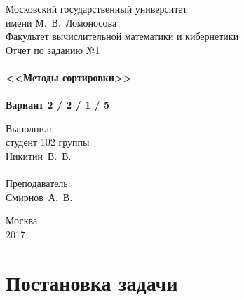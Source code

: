 \documentclass[a4paper,12pt,titlepage,finall]{article}
\begin{document}
\begin{titlepage}
    \begin{center}
	{\small \sc Московский государственный университет \\имени М.~В.~Ломоносова\\
	Факультет вычислительной математики и кибернетики\\}
	\vfill
	{\Large \sc Отчет по заданию №1}\\
	~\\
	{\large \bf <<Методы сортировки>>}\\ 
	~\\
	{\large \bf Вариант 2 / 2 / 1 / 5}
    \end{center}
    \begin{flushright}
	\vfill {Выполнил:\\
	студент 102  группы\\
	Никитин~В.~В.\\
	~\\
	Преподаватель:\\
	Смирнов~А.~В.}
    \end{flushright}
    \begin{center}
	\vfill
	{\small Москва\\2017}
    \end{center}
\end{titlepage}

\tableofcontents
\newpage

\section{Постановка задачи}
\end{document}
